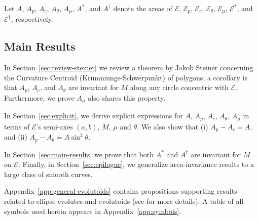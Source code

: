 Let $A$, $A_p$, $A_c$, $A_\theta$, $A_\mu$, $A^*$, and $A^\dagger$ denote the areas of $\mathcal{E}$, $\mathcal{E}_p$,
$\mathcal{E}_c$,
$\mathcal{E}_\theta$,
$\mathcal{E}_\mu$,  $\mathcal{E}^*$, and $\mathcal{E}^\dagger$, respectively. 

\subsection*{Main Results}

In Section~\ref{sec:review-steiner} we review a theorem by Jakob Steiner \cite{pamfilos2019-krummungs,steiner1838} concerning the Curvature Centroid (Krümmungs-Schwerpunkt) of polygons; a corollary is that $A_p$, $A_c$, and $A_{\theta}$ are invariant for $M$ along any circle concentric with $\mathcal{E}$. Furthermore, we prove $A_{\mu}$ also shares this property.

In Section~\ref{sec:explicit}, we derive explicit expressions for $A$, $A_p$, $A_c$, $A_\theta$, $A_\mu$ in terms of $\mathcal{E}$'s semi-axes $(a,b)$, $M$, $\mu$ and $\theta$. We also show that (i) $A_p-A_c=A$, and (ii) $A_p-A_\theta=A\sin^2\theta$.

In Section~\ref{sec:main-results} we prove that both $A^*$ and $A^\dagger$ are invariant for $M$ on $\mathcal{E}$. Finally, in Section~\ref{sec:epilogue}, we generalize area-invariance results to a large class of smooth curves. 

Appendix~\ref{app:general-evolutoids} contains  propositions supporting results related to ellipse evolutes and evolutoids (see \cite{jesus2015,jesus2014} for more details).
A table of all symbols used herein appears in Appendix~\ref{app:symbols}.




